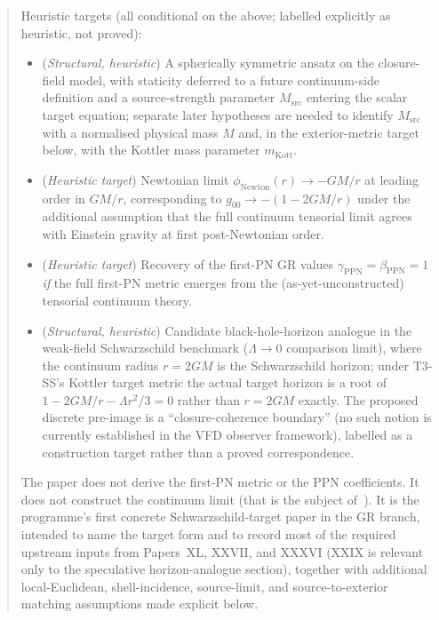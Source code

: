 \documentclass[12pt]{article}
\theoremstyle{definition}
\theoremstyle{remark}
\begin{document}
\begin{abstract}
Heuristic targets (all conditional on the above; labelled explicitly as heuristic, not proved):
\begin{itemize}
\item (\emph{Structural, heuristic}) A spherically symmetric ansatz on the closure-field model, with staticity deferred to a future continuum-side definition and a source-strength parameter $M_{\mathrm{src}}$ entering the scalar target equation; separate later hypotheses are needed to identify $M_{\mathrm{src}}$ with a normalised physical mass $M$ and, in the exterior-metric target below, with the Kottler mass parameter $m_{\mathrm{Kott}}$.
\item (\emph{Heuristic target}) Newtonian limit $\phi_{\mathrm{Newton}}(r) \to -GM/r$ at leading order in $GM/r$, corresponding to $g_{00} \to -(1 - 2GM/r)$ under the additional assumption that the full continuum tensorial limit agrees with Einstein gravity at first post-Newtonian order.
\item (\emph{Heuristic target}) Recovery of the first-PN GR values $\gamma_{\mathrm{PPN}} = \beta_{\mathrm{PPN}} = 1$ \emph{if} the full first-PN metric emerges from the (as-yet-unconstructed) tensorial continuum theory.
\item (\emph{Structural, heuristic}) Candidate black-hole-horizon analogue in the weak-field Schwarzschild benchmark ($\Lambda \to 0$ comparison limit), where the continuum radius $r = 2GM$ is the Schwarzschild horizon; under T3-SS's Kottler target metric the actual target horizon is a root of $1 - 2GM/r - \Lambda r^2/3 = 0$ rather than $r = 2GM$ exactly. The proposed discrete pre-image is a ``closure-coherence boundary'' (no such notion is currently established in the VFD observer framework), labelled as a construction target rather than a proved correspondence.
\end{itemize}
The paper does not derive the first-PN metric or the PPN coefficients. It does not construct the continuum limit (that is the subject of~\citep{SmartXL}). It is the programme's first concrete Schwarzschild-target paper in the GR branch, intended to name the target form and to record most of the required upstream inputs from Papers~XL, XXVII, and XXXVI (XXIX is relevant only to the speculative horizon-analogue section), together with additional local-Euclidean, shell-incidence, source-limit, and source-to-exterior matching assumptions made explicit below.
\end{abstract}

\end{document}
